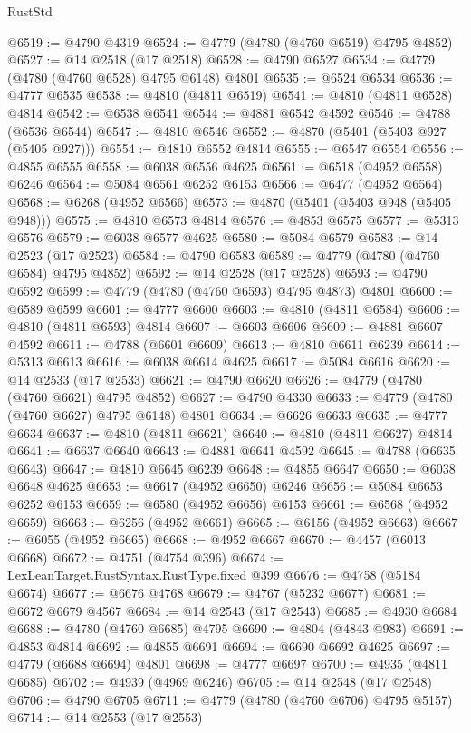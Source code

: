 \begin{lexlean}{RustStd}
\begin{coremodule}
@6519 := @4790 @4319
@6524 := @4779 (@4780 (@4760 @6519) @4795 @4852)
@6527 := @14 @2518 (@17 @2518)
@6528 := @4790 @6527
@6534 := @4779 (@4780 (@4760 @6528) @4795 @6148) @4801
@6535 := @6524 @6534
@6536 := @4777 @6535
@6538 := @4810 (@4811 @6519)
@6541 := @4810 (@4811 @6528) @4814
@6542 := @6538 @6541
@6544 := @4881 @6542 @4592
@6546 := @4788 (@6536 @6544)
@6547 := @4810 @6546
@6552 := @4870 (@5401 (@5403 @927 (@5405 @927)))
@6554 := @4810 @6552 @4814
@6555 := @6547 @6554
@6556 := @4855 @6555
@6558 := @6038 @6556 @4625
@6561 := @6518 (@4952 @6558) @6246
@6564 := @5084 @6561 @6252 @6153
@6566 := @6477 (@4952 @6564)
@6568 := @6268 (@4952 @6566)
@6573 := @4870 (@5401 (@5403 @948 (@5405 @948)))
@6575 := @4810 @6573 @4814
@6576 := @4853 @6575
@6577 := @5313 @6576
@6579 := @6038 @6577 @4625
@6580 := @5084 @6579
@6583 := @14 @2523 (@17 @2523)
@6584 := @4790 @6583
@6589 := @4779 (@4780 (@4760 @6584) @4795 @4852)
@6592 := @14 @2528 (@17 @2528)
@6593 := @4790 @6592
@6599 := @4779 (@4780 (@4760 @6593) @4795 @4873) @4801
@6600 := @6589 @6599
@6601 := @4777 @6600
@6603 := @4810 (@4811 @6584)
@6606 := @4810 (@4811 @6593) @4814
@6607 := @6603 @6606
@6609 := @4881 @6607 @4592
@6611 := @4788 (@6601 @6609)
@6613 := @4810 @6611 @6239
@6614 := @5313 @6613
@6616 := @6038 @6614 @4625
@6617 := @5084 @6616
@6620 := @14 @2533 (@17 @2533)
@6621 := @4790 @6620
@6626 := @4779 (@4780 (@4760 @6621) @4795 @4852)
@6627 := @4790 @4330
@6633 := @4779 (@4780 (@4760 @6627) @4795 @6148) @4801
@6634 := @6626 @6633
@6635 := @4777 @6634
@6637 := @4810 (@4811 @6621)
@6640 := @4810 (@4811 @6627) @4814
@6641 := @6637 @6640
@6643 := @4881 @6641 @4592
@6645 := @4788 (@6635 @6643)
@6647 := @4810 @6645 @6239
@6648 := @4855 @6647
@6650 := @6038 @6648 @4625
@6653 := @6617 (@4952 @6650) @6246
@6656 := @5084 @6653 @6252 @6153
@6659 := @6580 (@4952 @6656) @6153
@6661 := @6568 (@4952 @6659)
@6663 := @6256 (@4952 @6661)
@6665 := @6156 (@4952 @6663)
@6667 := @6055 (@4952 @6665)
@6668 := @4952 @6667
@6670 := @4457 (@6013 @6668)
@6672 := @4751 (@4754 @396)
@6674 := LexLeanTarget.RustSyntax.RustType.fixed @399
@6676 := @4758 (@5184 @6674)
@6677 := @6676 @4768
@6679 := @4767 (@5232 @6677)
@6681 := @6672 @6679 @4567
@6684 := @14 @2543 (@17 @2543)
@6685 := @4930 @6684
@6688 := @4780 (@4760 @6685) @4795
@6690 := @4804 (@4843 @983)
@6691 := @4853 @4814
@6692 := @4855 @6691
@6694 := @6690 @6692 @4625
@6697 := @4779 (@6688 @6694) @4801
@6698 := @4777 @6697
@6700 := @4935 (@4811 @6685)
@6702 := @4939 (@4969 @6246)
@6705 := @14 @2548 (@17 @2548)
@6706 := @4790 @6705
@6711 := @4779 (@4780 (@4760 @6706) @4795 @5157)
@6714 := @14 @2553 (@17 @2553)

\end{coremodule}
\end{lexlean}
